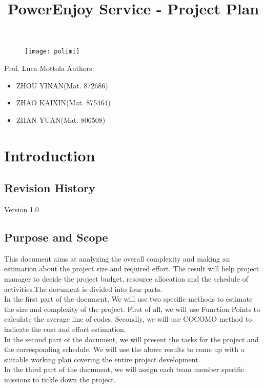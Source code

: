 \documentclass{article}
\title{PowerEnjoy Service - Project Plan}
\begin{document}
\begin{titlepage}
\begin{figure}
	\centering
	\texttt{[image: polimi]}
\end{figure}
\maketitle
\centering
Prof. Luca Mottola
\newline
\raggedleft
Authors:
\begin{itemize}
	\raggedleft
	\item ZHOU YINAN(Mat. 872686)
	\item ZHAO KAIXIN(Mat. 875464)
	\item ZHAN YUAN(Mat. 806508)	
\end{itemize}
\end{titlepage}

\tableofcontents
\newpage
\section{Introduction}
\subsection{Revision History}
Version 1.0
\subsection{Purpose and Scope}
This document aims at analyzing the overall complexity and making an estimation about the project size and required effort. The result will help project manager to decide the project budget, resource allocation and the schedule of activities.The document is divided into four parts. \\

In the first part of the document, We will use two specific methods to estimate the size and complexity of the project. First of all, we will use Function Points to calculate the average line of codes. Secondly, we will use COCOMO method to indicate the cost and effort estimation. \\

In the second part of the document, we will present the tasks for the project and the corresponding schedule. We will use the above results to come up with a suitable working plan covering the entire project development.\\

In the third part of the document, we will assign each team member specific missions to tickle down the project.\\
\end{document}
